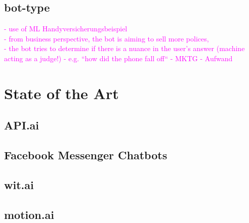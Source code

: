 \subsection{bot-type}
\textcolor{magenta}{
- use of ML
Handyversicherungsbeispiel\\
- from business perspective, the bot is aiming to sell more polices,\\ 
- the bot tries to determine if there is a nuance in the user's answer (machine acting as a judge!)
- e.g. ``how did the phone fall off``
- MKTG - Aufwand
}





\section{State of the Art}

\subsection{API.ai}

\subsection{Facebook Messenger Chatbots}
\subsection{wit.ai}
\subsection{motion.ai}

